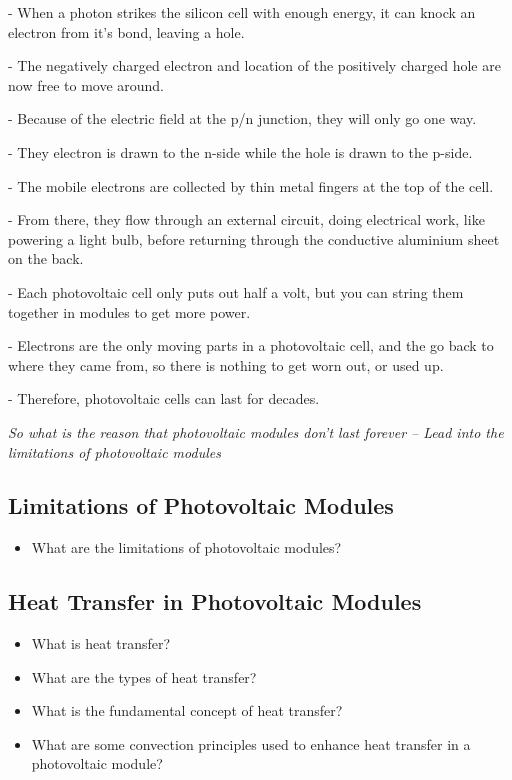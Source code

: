 \noindent - When a photon strikes the silicon cell with enough energy, it can knock an electron from it's bond, leaving a hole.\par
\noindent - The negatively charged electron and location of the positively charged hole are now free to move around.\par
\noindent - Because of the electric field at the p/n junction, they will only go one way.\par
\noindent - They electron is drawn to the n-side while the hole is drawn to the p-side.\par
\noindent - The mobile electrons are collected by thin metal fingers at the top of the cell.\par
\noindent - From there, they flow through an external circuit, doing electrical work, like powering a light bulb, before returning through the conductive aluminium sheet on the back.\par
\noindent - Each photovoltaic cell only puts out half a volt, but you can string them together in modules to get more power.\par
\noindent - Electrons are the only moving parts in a photovoltaic cell, and the go back to where they came from, so there is nothing to get worn out, or used up.\par
\noindent - Therefore, photovoltaic cells can last for decades.\vspace{0.5em}

\noindent \textit{So what is the reason that photovoltaic modules don't last forever -- Lead into the limitations of photovoltaic modules}






\subsection{Limitations of Photovoltaic Modules}
\begin{itemize}
    \item What are the limitations of photovoltaic modules?
\end{itemize}

\subsection{Heat Transfer in Photovoltaic Modules}
\begin{itemize}
    \item What is heat transfer?
    \item What are the types of heat transfer?
    \item What is the fundamental concept of heat transfer?
    \item What are some convection principles used to enhance heat transfer in a photovoltaic module?
\end{itemize}


